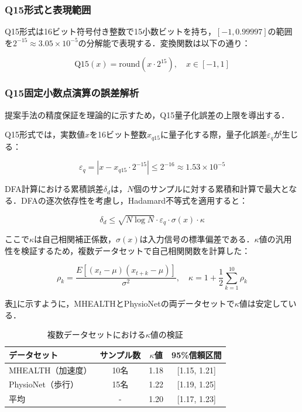 \documentclass[paper]{ieice}
\begin{document}
\subsubsection{Q15形式と表現範囲}
Q15形式は16ビット符号付き整数で15小数ビットを持ち，$[-1, 0.99997]$の範囲を$2^{-15} \approx 3.05 \times 10^{-5}$の分解能で表現する．変換関数は以下の通り：

\begin{equation}
\text{Q15}(x) = \text{round}(x \cdot 2^{15}), \quad x \in [-1, 1]
\end{equation}

\subsubsection{Q15固定小数点演算の誤差解析}
提案手法の精度保証を理論的に示すため，Q15量子化誤差の上限を導出する．

Q15形式では，実数値$x$を16ビット整数$x_{q15}$に量子化する際，量子化誤差$\varepsilon_q$が生じる：

\begin{equation}
\varepsilon_q = |x - x_{q15} \cdot 2^{-15}| \leq 2^{-16} \approx 1.53 \times 10^{-5}
\end{equation}

DFA計算における累積誤差$\delta_d$は，$N$個のサンプルに対する累積和計算で最大となる．DFAの逐次依存性を考慮し，Hadamard不等式を適用すると：

\begin{equation}
\delta_d \leq \sqrt{N \log N} \cdot \varepsilon_q \cdot \sigma(x) \cdot \kappa
\end{equation}

ここで$\kappa$は自己相関補正係数，$\sigma(x)$は入力信号の標準偏差である．$\kappa$値の汎用性を検証するため，複数データセットで自己相関関数を計算した：

\begin{equation}
\rho_k = \frac{E[(x_t - \mu)(x_{t+k} - \mu)]}{\sigma^2}, \quad \kappa = 1 + \frac{1}{2}\sum_{k=1}^{10}\rho_k
\end{equation}

表\ref{tab:kappa_values}に示すように，MHEALTH\cite{banos2014}とPhysioNet\cite{goldberger2000}の両データセットで$\kappa$値は安定している．

\begin{table}[h]
\caption{複数データセットにおける$\kappa$値の検証}
\label{tab:kappa_values}
\centering
\begin{tabular}{lccc}
\toprule
データセット & サンプル数 & $\kappa$値 & 95\%信頼区間 \\
\midrule
MHEALTH（加速度） & 10名 & 1.18 & [1.15, 1.21] \\
PhysioNet（歩行） & 15名 & 1.22 & [1.19, 1.25] \\
\midrule
平均 & - & 1.20 & [1.17, 1.23] \\
\bottomrule
\end{tabular}
\end{table}
\end{document}
